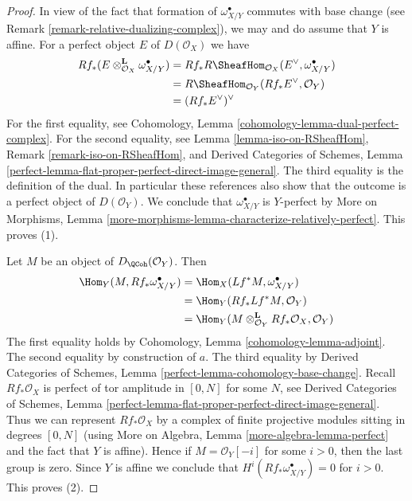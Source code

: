 \begin{proof}
In view of the fact that formation of $\omega_{X/Y}^\bullet$ commutes
with base change (see Remark \ref{remark-relative-dualizing-complex}),
we may and do assume that $Y$ is affine. For a perfect object $E$ of
$D(\mathcal{O}_X)$ we have
\begin{align*}
Rf_*(E \otimes_{\mathcal{O}_X}^\mathbf{L} \omega_{X/Y}^\bullet)
& =
Rf_*R\SheafHom_{\mathcal{O}_X}(E^\vee, \omega_{X/Y}^\bullet) \\
& =
R\SheafHom_{\mathcal{O}_Y}(Rf_*E^\vee, \mathcal{O}_Y) \\
& =
(Rf_*E^\vee)^\vee
\end{align*}
For the first equality, see
Cohomology, Lemma \ref{cohomology-lemma-dual-perfect-complex}.
For the second equality, see Lemma \ref{lemma-iso-on-RSheafHom},
Remark \ref{remark-iso-on-RSheafHom}, and 
Derived Categories of Schemes, Lemma
\ref{perfect-lemma-flat-proper-perfect-direct-image-general}.
The third equality is the definition of the dual. In particular
these references also show that the outcome is a perfect object
of $D(\mathcal{O}_Y)$. We conclude that $\omega_{X/Y}^\bullet$
is $Y$-perfect by More on Morphisms, Lemma
\ref{more-morphisms-lemma-characterize-relatively-perfect}.
This proves (1).

\medskip\noindent
Let $M$ be an object of $D_\QCoh(\mathcal{O}_Y)$. Then
\begin{align*}
\Hom_Y(M, Rf_*\omega_{X/Y}^\bullet) & =
\Hom_X(Lf^*M, \omega_{X/Y}^\bullet) \\
& =
\Hom_Y(Rf_*Lf^*M, \mathcal{O}_Y) \\
& =
\Hom_Y(M \otimes_{\mathcal{O}_Y}^\mathbf{L} Rf_*\mathcal{O}_X, \mathcal{O}_Y)
\end{align*}
The first equality holds by Cohomology, Lemma
\ref{cohomology-lemma-adjoint}.
The second equality by construction of $a$.
The third equality by Derived Categories of Schemes, Lemma
\ref{perfect-lemma-cohomology-base-change}.
Recall $Rf_*\mathcal{O}_X$ is perfect of tor amplitude in $[0, N]$
for some $N$, see
Derived Categories of Schemes, Lemma
\ref{perfect-lemma-flat-proper-perfect-direct-image-general}.
Thus we can represent $Rf_*\mathcal{O}_X$ by a complex of
finite projective modules sitting in degrees $[0, N]$
(using More on Algebra, Lemma \ref{more-algebra-lemma-perfect}
and the fact that $Y$ is affine).
Hence if $M = \mathcal{O}_Y[-i]$ for some $i > 0$, then the last
group is zero. Since $Y$ is affine we conclude that
$H^i(Rf_*\omega_{X/Y}^\bullet) = 0$ for $i > 0$.
This proves (2).


\end{proof}
